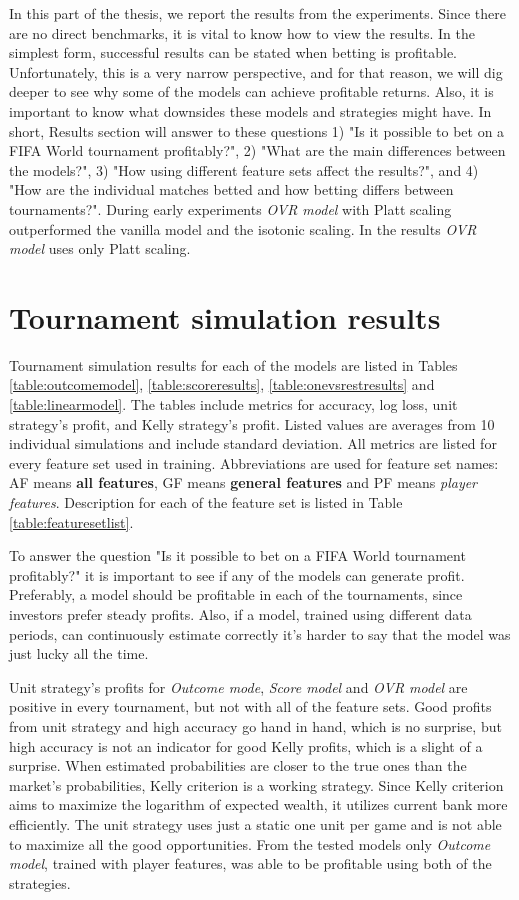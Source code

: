 In this part of the thesis, we report the results from the experiments. Since there are no direct benchmarks, it is vital to know how to view the results. In the simplest form, successful results can be stated when betting is profitable. Unfortunately, this is a very narrow perspective, and for that reason, we will dig deeper to see why some of the models can achieve profitable returns. Also, it is important to know what downsides these models and strategies might have.  In short, Results section will answer to these questions 1) "Is it possible to bet on a FIFA World tournament profitably?",  2) "What are the main differences between the models?", 3) "How using different feature sets affect the results?", and 4) "How are the individual matches betted and how betting differs between tournaments?". During early experiments \textit{OVR model} with Platt scaling outperformed the vanilla model and the isotonic scaling. In the results \textit{OVR model} uses only Platt scaling.

\section{Tournament simulation results}
Tournament simulation results for each of the models are listed in Tables \ref{table:outcomemodel}, \ref{table:scoreresults}, \ref{table:onevsrestresults} and \ref{table:linearmodel}. The tables include metrics for accuracy, log loss, unit strategy's profit, and Kelly strategy's profit. Listed values are averages from 10 individual simulations and include standard deviation. All metrics are listed for every feature set used in training. Abbreviations are used for feature set names: AF means \textbf{all features}, GF means \textbf{general features} and PF means \textit{player features}. Description for each of the feature set is listed in Table \ref{table:featuresetlist}.

To answer the question "Is it possible to bet on a FIFA World tournament profitably?" it is important to see if any of the models can generate profit. Preferably, a model should be profitable in each of the tournaments, since investors prefer steady profits. Also, if a model, trained using different data periods, can continuously estimate correctly it's harder to say that the model was just lucky all the time.

Unit strategy's profits for \textit{Outcome mode}, \textit{Score model} and \textit{OVR model} are positive in every tournament, but not with all of the feature sets. Good profits from unit strategy and high accuracy go hand in hand, which is no surprise, but high accuracy is not an indicator for good Kelly profits, which is a slight of a surprise. When estimated probabilities are closer to the true ones than the market's probabilities, Kelly criterion is a working strategy. Since Kelly criterion aims to maximize the logarithm of expected wealth, it utilizes current bank more efficiently. The unit strategy uses just a static one unit per game and is not able to maximize all the good opportunities. From the tested models only \textit{Outcome model}, trained with player features, was able to be profitable using both of the strategies.


